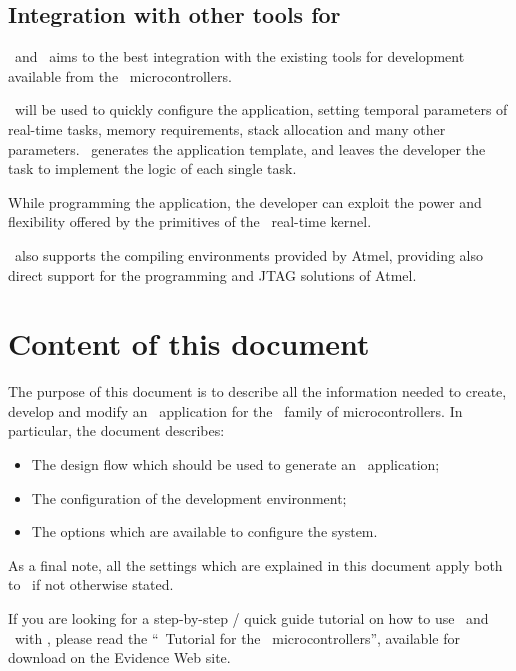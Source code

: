 \subsection{Integration with other tools for \avr}

\ee\ and \rtd\ aims to the best integration with the existing tools
for development available from the \avr\ microcontrollers.

\rtd\ will be used to quickly configure the application, setting
temporal parameters of real-time tasks, memory requirements, stack
allocation and many other parameters. \rtd\ generates the application
template, and leaves the developer the task to implement the logic of
each single task.

While programming the application, the developer can exploit the power
and flexibility offered by the primitives of the \ee\ real-time
kernel.

\ee\ also supports the compiling environments provided by Atmel,
providing also direct support for the programming and JTAG solutions
of Atmel.

\section{Content of this document}

The purpose of this document is to describe all the information needed
to create, develop and modify an \ee\ application for the \avr\ family
of microcontrollers. In particular, the document describes:
\begin{itemize}
\item The design flow which should be used to generate an \ee\ application;
\item The configuration of the development environment;
\item The options which are available to configure the system.
\end{itemize}

As a final note, all the settings which are explained in this document
apply both to \ee\, if not otherwise stated.

\begin{note}
If you are looking for a step-by-step / quick guide tutorial on how to
use \ee\ and \rtd\ with \avr, please read the ``\ee\ Tutorial for the
\avr\ microcontrollers'', available for download on the Evidence Web
site.
\end{note}
